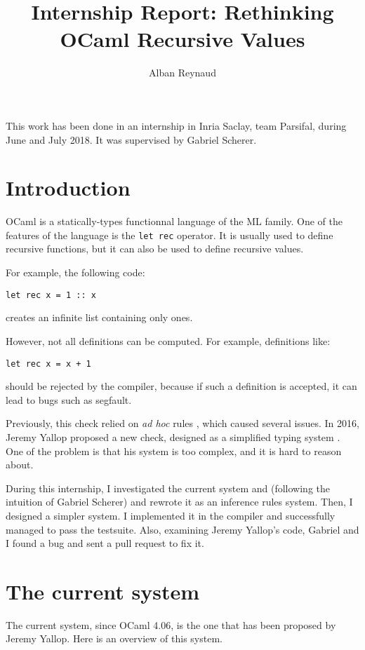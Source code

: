 \documentclass{article}
\title{Internship Report: Rethinking OCaml Recursive Values}
\author{Alban Reynaud}
\date{}
\begin{document}
\maketitle

This work has been done in an internship in Inria Saclay, team Parsifal, during
June and July 2018. It was supervised by Gabriel Scherer.

\section{Introduction}
OCaml is a statically-types functionnal language of the ML family. One of the
features of the language is the \lstinline|let rec| operator. It is usually
used to define recursive functions, but it can also be used to define recursive
values.

For example, the following code:
\begin{lstlisting}
let rec x = 1 :: x
\end{lstlisting}
creates an infinite list containing only ones.

However, not all definitions can be computed. For example, definitions like:
\begin{lstlisting}
let rec x = x + 1
\end{lstlisting}
should be rejected by the compiler, because if such a definition is accepted, it
can lead to bugs such as segfault. %

Previously, this check relied on \textit{ad hoc} rules \cite{PreviousRules},
which caused several issues. In 2016, Jeremy Yallop proposed a new check,
designed as a simplified typing system \cite{Yallop}. One of the problem is that
his system is too complex, and it is hard to reason about.

During this internship, I investigated the current system and (following the
intuition of Gabriel Scherer) and rewrote it as an inference rules system. Then,
I designed a simpler system. I implemented it in the compiler and successfully
managed to pass the testsuite. Also, examining Jeremy Yallop's code, Gabriel and
I found a bug and sent a pull request to fix it.

\section{The current system}
The current system, since OCaml 4.06, is the one that has been proposed by
Jeremy Yallop. Here is an overview of this system.
\end{document}

